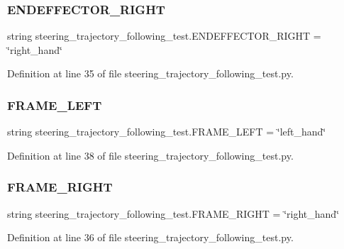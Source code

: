\subsubsection{\texorpdfstring{ENDEFFECTOR\_RIGHT}{ENDEFFECTOR\_RIGHT}}
{\footnotesize\ttfamily string steering\+\_\+trajectory\+\_\+following\+\_\+test.\+E\+N\+D\+E\+F\+F\+E\+C\+T\+O\+R\+\_\+\+R\+I\+G\+HT = \char`\"{}right\+\_\+hand\char`\"{}}



Definition at line 35 of file steering\+\_\+trajectory\+\_\+following\+\_\+test.\+py.

\mbox{\label{namespacesteering__trajectory__following__test_a1715eb3be2d0df23493b6618f822a20b}} 
\subsubsection{\texorpdfstring{FRAME\_LEFT}{FRAME\_LEFT}}
{\footnotesize\ttfamily string steering\+\_\+trajectory\+\_\+following\+\_\+test.\+F\+R\+A\+M\+E\+\_\+\+L\+E\+FT = \char`\"{}left\+\_\+hand\char`\"{}}



Definition at line 38 of file steering\+\_\+trajectory\+\_\+following\+\_\+test.\+py.

\mbox{\label{namespacesteering__trajectory__following__test_ad2b3d81f8b97a726200a2c467b173ea7}} 
\subsubsection{\texorpdfstring{FRAME\_RIGHT}{FRAME\_RIGHT}}
{\footnotesize\ttfamily string steering\+\_\+trajectory\+\_\+following\+\_\+test.\+F\+R\+A\+M\+E\+\_\+\+R\+I\+G\+HT = \char`\"{}right\+\_\+hand\char`\"{}}



Definition at line 36 of file steering\+\_\+trajectory\+\_\+following\+\_\+test.\+py.

